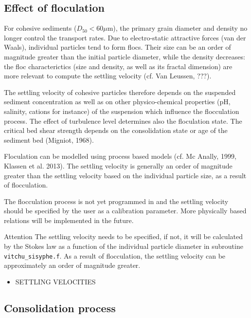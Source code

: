 \subsection{Effect of floculation}


For cohesive sediments ($D_{50} < 60 \mu$m), the primary grain
diameter and density no longer control the transport rates. Due to electro-static
attractive forces (van der Waals), individual particles tend to form flocs.
Their size can be an order of magnitude greater than the initial particle
diameter, while the density decreases: the floc characterictics (size and
density, as well as its fractal dimension) are more relevant to compute the settling velocity (cf. Van Leussen, ???).

The settling velocity of cohesive particles therefore depends on the
suspended sediment concentration as well as on other physico-chemical
properties (pH, salinity, cations for instance) of the suspension which
influence the flocculation process. The effect of turbulence level
determines also the floculation state. The critical bed shear strength
depends on the consolidation state or age of the sediment bed (Migniot,
1968).

Floculation can be modelled using process based models (cf. Mc Anally, 1999, Klassen et al. 2013).
The settling velocity is generally an
order of magnitude greater than the settling velocity based on the individual
particle size, as a result of flocculation.

The flocculation process is not yet programmed in \sisyphe and the settling
velocity should be specified by the user as a calibration parameter. 
More physically based relations will be
implemented in the future. 


\begin{bclogo}[couleur = blue!10, arrondi = 0.10, logo = \bcattention]{\textsf{Attention}}
 The settling velocity needs to be specified, if not, it will
be calculated by the Stokes law as a function of the individual particle
diameter in subroutine \texttt{vitchu\_sisyphe.f}. As a result of flocculation, the
settling velocity can be approximately an order of magnitude greater. 
\begin{itemize}
\item {\ttfamily SETTLING VELOCITIES}
\end{itemize}
\end{bclogo}



\subsection{Consolidation process}\label{sec:4.1}


